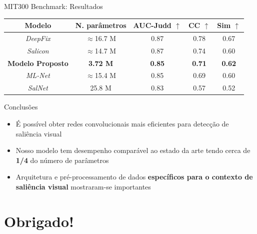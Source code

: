\documentclass[10pt]{beamer}
\newcommand{\tbf}[1]{\textbf{#1}}
\begin{document}
\begin{frame}{MIT300 Benchmark: Resultados}
\begin{table}[!htb]
	\small
    \centering
    \label{table:results}
    \begin{tabular}{|c|c|c|c|c|}
        \hline
        Modelo & N. parâmetros & AUC-Judd $\uparrow$ & CC $\uparrow$
            & Sim $\uparrow$\\
        \hline
        \emph{DeepFix} & $\approx$16.7 M & 0.87 & 0.78
            & 0.67\\
        \hline
        \emph{Salicon} & $\approx$14.7 M & 0.87 & 0.74
            & 0.60\\
        \hline
        \textbf{Modelo Proposto} & \textbf{3.72 M} & \textbf{0.85} &
        \textbf{0.71} & \textbf{0.62}\\
        \hline
        \emph{ML-Net} & $\approx$15.4 M & 0.85 & 0.69 & 0.60\\
        \hline
        \emph{SalNet} & 25.8 M & 0.83 & 0.57 & 0.52\\
        \hline
    \end{tabular}
\end{table}
\end{frame}

\begin{frame}{Conclusões}
    \begin{itemize}[<+->]
        \item É possível obter redes convolucionais mais eficientes para
            detecção de saliência visual
        \item Nosso modelo tem desempenho comparável ao estado da arte
            tendo cerca de \tbf{1/4} do número de parâmetros
        \item Arquitetura e pré-processamento de dados \tbf{específicos
            para o contexto de saliência visual} mostraram-se importantes
    \end{itemize}
\end{frame}

\section{Obrigado!}
\end{document}
